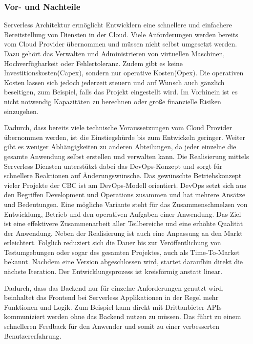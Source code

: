 \subsubsection{Vor- und Nachteile}
Serverless Architektur ermöglicht Entwicklern eine schnellere und einfachere Bereitstellung von Diensten in der Cloud.
Viele Anforderungen werden bereits vom Cloud Provider übernommen und müssen nicht selbst umgesetzt werden.
Dazu gehört das Verwalten und Administrieren von virtuellen Maschinen, Hochverfügbarkeit oder Fehlertoleranz.
Zudem gibt es keine Investitionskosten(Capex), sondern nur operative Kosten(Opex).
Die operativen Kosten lassen sich jedoch jederzeit steuern und auf Wunsch auch gänzlich beseitigen, zum Beispiel, falls das Projekt eingestellt wird.
Im Vorhinein ist es nicht notwendig Kapazitäten zu berechnen oder große finanzielle Risiken einzugehen.

Dadurch, dass bereits viele technische Voraussetzungen vom Cloud Provider übernommen werden, ist die Einstiegshürde bis zum Entwickeln geringer.
Weiter gibt es weniger Abhängigkeiten zu anderen Abteilungen, da jeder einzelne die gesamte Anwendung selbst erstellen und verwalten kann.
Die Realisierung mittels Serverless Diensten unterstützt dabei das DevOps-Konzept und sorgt für schnellere Reaktionen auf Änderungswünsche.
Das gewünschte Betriebskonzept vieler Projekte der CBC ist am DevOps-Modell orientiert.
DevOps setzt sich aus den Begriffen Development und Operations zusammen und hat mehrere Ansätze und Bedeutungen.
Eine mögliche Variante steht für das Zu­sam­men­schmel­zen von Entwicklung, Betrieb und den operativen Aufgaben einer Anwendung.
Das Ziel ist eine effektivere Zusammenarbeit aller Teilbereiche und eine erhöhte Qualität der Anwendung.
Neben der Realisierung ist auch eine Anpassung an den Markt erleichtert.
Folglich reduziert sich die Dauer bis zur Veröffentlichung von Testumgebungen oder sogar des gesamten Projektes, auch als Time-To-Market bekannt.
Nachdem eine Version abgeschlossen wird, startet daraufhin direkt die nächste Iteration.
Der Entwicklungsprozess ist kreisförmig anstatt linear.
\cite{DevOps}

Dadurch, dass das Backend nur für einzelne Anforderungen genutzt wird, beinhaltet das Frontend bei Serverless Applikationen in der Regel mehr Funktionen und Logik.
Zum Beispiel kann direkt mit Drittanbieter-APIs kommuniziert werden ohne das Backend nutzen zu müssen.
Das führt zu einem schnelleren Feedback für den Anwender und somit zu einer verbesserten Benutzererfahrung.

